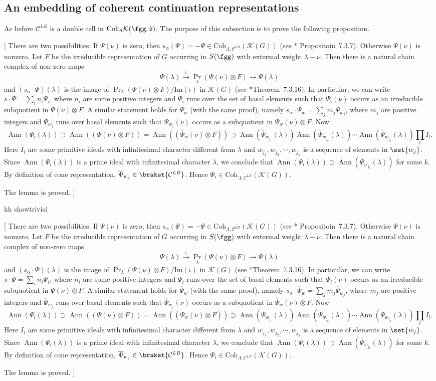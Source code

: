 \documentclass[12pt]{amsart}
\newcommand{\trivial}[2][]{\if\relax\detokenize{#1}\relax
  {%
      \color{orange} \vspace{0em}$[$#2$]$
      \color{black}
  }
  \else
\ifx#1h
\ifcsname showtrivial\endcsname
{%
    \color{orange}\vspace{0em}$[$#2$]$
    \color{black}
}
\fi
\else {\red Wrong argument!} \fi
\fi
}
\def\Im{\operatorname{Im}}
\newcommand{\CC}{{\mathcal {C}}}
\newcommand{\CK}{{\mathcal {K}}}
\DeclareMathOperator{\Ann}{Ann}
\def\CCLR{\CC^{LR}}
\renewcommand{\b}{\mathfrak b}
\numberwithin{equation}{section}
\newtheorem{cor}[thm]{Corollary}
\theoremstyle{remark}
\def\Im{\mathrm{Im}}
\def\Coh{\mathrm{Coh}}
\def\bPsi{\overline{\Psi}}
\begin{document}
%
%
%
%

\subsection{An embedding of  coherent continuation representations}
As before $\CC^{LR}$ is a double cell in $\Coh_\Lambda \CK(\fgg,\b)$. The purpose of this subsection is to prove the following proposition.


\trivial[h]{
There are two possibilities:
If $\Psi(\nu)$ is zero, then $s_\alpha(\Psi) = -\Psi \in \Coh_{\Lambda, \CC^{LR}}(\CK(G))$
(see \cite{Vg}*{ Propositoin~7.3.7}).
Otherwise $\Psi(\nu)$ is nonzero.
Let $F$ be the irreducible representation of $G$ occurring in $S(\fgg)$ with extermal weight
$\lambda-\nu$.
Then there is a natural chain complex of non-zero maps
\[
\Psi(\lambda)\xrightarrow{\iota}  {\Pr}_{\lambda}(\Psi(\nu)\otimes F)\rightarrow  \Psi(\lambda)
\]
and $(s_\alpha\cdot \Psi)(\lambda)$ is the image of ${\Pr}_{\lambda}(\Psi(\nu)\otimes F)/\Im(\iota)$ in
$\CK(G)$ (see \cite{Vg}*{Theorem~7.3.16}).
In particular,  we can write $s\cdot \Psi = \sum_{i}n_i \Psi_i$,
where $n_i$ are some positive integers and $\Psi_i$ runs over the set of basal elements such that $\Psi_i(\nu)$ occurs as an irreducible subquotient in $\Psi(\nu)\otimes F$.
A similar statement holds for $\bPsi_w$ (with the same proof), namely $s_\alpha \cdot \bPsi_w = \sum_j m_j\bPsi_{w_j}$,
where $m_j$ are positive integers and  $\bPsi_{w_j}$ runs over basal elements such that  $\bPsi_{w_j}(\nu)$ occurs as a subquotient in $\bPsi_w(\nu)\otimes F$.
Now
\[
\Ann(\Psi_i(\lambda)) \supset \Ann((\Psi(\nu)\otimes F))
= \Ann((\bPsi_w(\nu)\otimes F))
\supset \Ann(\bPsi_{w_{j_1}}(\lambda)) \Ann(\bPsi_{w_{j_2}}(\lambda))\cdots \Ann(\bPsi_{w_{j_k}}(\lambda))\prod_{l} I_l.
\]
Here $I_l$
are some primitive ideals with infinitesimal character different from $\lambda$
and $w_{j_1},w_{j_2}, \cdots, w_{j_k}$ is a sequence of elements in $\set{w_j}$.
Since $\Ann(\Psi_i(\lambda))$ is a prime ideal with infinitesimal character $\lambda$, we conclude that
$\Ann(\Psi_i(\lambda)) \supset \Ann(\bPsi_{w_{j_k}}(\lambda))$ for some $k$.
By definition of cone representation, $\bPsi_{w_j} \in \braket{\CC^{LR}}$.
Hence $\Psi_i\in \Coh_{\Lambda, \CC^{LR}}(\CK(G))$.

The lemma is proved.
}
\end{document}
